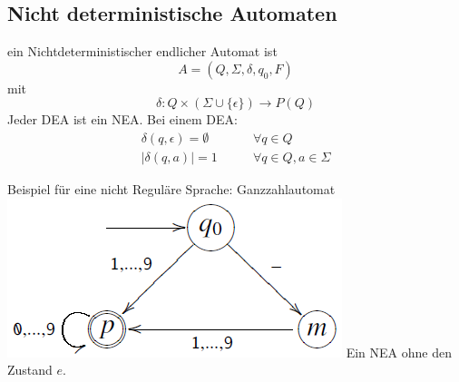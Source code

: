 \documentclass[a4paper]{article}
\begin{document}
\subsection{Nicht deterministische Automaten}
	\begin{multicols}{2}
	
	\begin{fdef}
		ein Nichtdeterministischer endlicher Automat ist 
		$$A = (Q, \Sigma, \delta, q_0, F)$$
		mit
		$$\delta : Q \times (\Sigma \cup \{\epsilon\}) \rightarrow P(Q)$$
		Jeder DEA ist ein NEA. Bei einem DEA:
		\begin{align*}
			\delta(q,\epsilon) = \emptyset \qquad & \forall q \in Q \\
			|\delta(q,a)| = 1              \qquad & \forall q \in Q, a \in \Sigma
		\end{align*}
	\end{fdef}
	
	Beispiel für eine nicht Reguläre Sprache: Ganzzahlautomat
	\includegraphics[scale=0.7]{nea_beispiel.png}
	Ein NEA ohne den Zustand $e$.
	\end{multicols}
	
\end{document}
